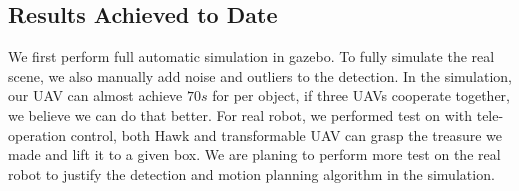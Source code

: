 \documentclass{standalone}
\begin{document}
\subsection{Results Achieved to Date}
We first perform full automatic simulation in gazebo. To fully simulate the real scene, we also manually add noise and outliers to the detection. In the simulation, our UAV can almost achieve $70s$ for per object, if three UAVs cooperate together, we believe we can do that better. For real robot, we performed test on with tele-operation control, both Hawk and transformable UAV can grasp the treasure we made and lift it to a given box. We are planing to perform more test on the real robot to justify the detection and motion planning algorithm in the simulation.
\end{document}
